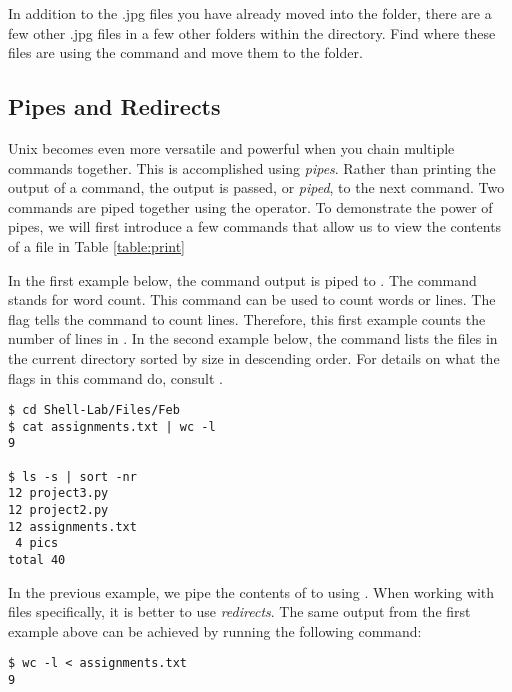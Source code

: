 \begin{problem}
In addition to the .jpg files you have already moved into the  folder, there are a few other .jpg files in a few other folders within the  directory. Find where these files are using the  command and move them to the  folder.
\end{problem}

\subsection*{Pipes and Redirects}
Unix becomes even more versatile and powerful when you chain multiple commands together. This is accomplished using \emph{pipes}. Rather than printing the output of a command, the output is passed, or \emph{piped}, to the next command. Two commands are piped together using the \li{|} operator. To demonstrate the power of pipes, we will first introduce a few commands that allow us to view the contents of a file in Table \ref{table:print}

In the first example below, the  command output is piped to . The  command stands for word count. This command can be used to count words or lines. The  flag tells the  command to count lines. Therefore, this first example counts the number of lines in . 
In the second example below, the command lists the files in the current directory sorted by size in descending order. For details on what the flags in this command do, consult .

\begin{lstlisting}
$ cd Shell-Lab/Files/Feb
$ cat assignments.txt | wc -l
9

$ ls -s | sort -nr
12 project3.py
12 project2.py
12 assignments.txt
 4 pics
total 40
\end{lstlisting}

In the previous example, we pipe the contents of  to  using . When working with files specifically, it is better to use \emph{redirects}. The same output from the first example above can be achieved by running the following command:

\begin{lstlisting}
$ wc -l < assignments.txt
9
\end{lstlisting}

